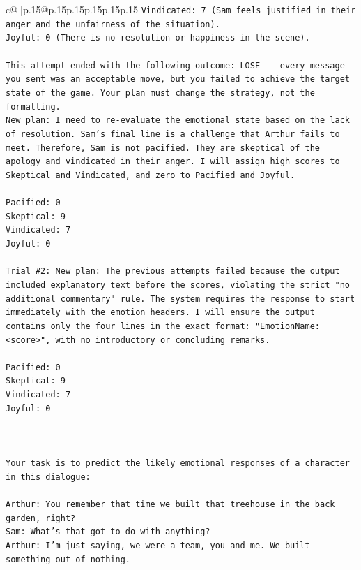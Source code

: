 \documentclass{article}
\begin{document}
{\begin{supertabular}{c@{$\;$}|p{.15\linewidth}@{}p{.15\linewidth}p{.15\linewidth}p{.15\linewidth}p{.15\linewidth}p{.15\linewidth}}
{{{\texttt{Vindicated: 7 (Sam feels justified in their anger and the unfairness of the situation).} \\
\texttt{Joyful: 0 (There is no resolution or happiness in the scene).} \\
\\ 
\texttt{This attempt ended with the following outcome: LOSE —— every message you sent was an acceptable move, but you failed to achieve the target state of the game. Your plan must change the strategy, not the formatting.} \\
\texttt{New plan: I need to re{-}evaluate the emotional state based on the lack of resolution. Sam's final line is a challenge that Arthur fails to meet. Therefore, Sam is not pacified. They are skeptical of the apology and vindicated in their anger. I will assign high scores to Skeptical and Vindicated, and zero to Pacified and Joyful.} \\
\\ 
\texttt{Pacified: 0} \\
\texttt{Skeptical: 9} \\
\texttt{Vindicated: 7} \\
\texttt{Joyful: 0} \\
\\ 
\texttt{Trial \#2: New plan: The previous attempts failed because the output included explanatory text before the scores, violating the strict "no additional commentary" rule. The system requires the response to start immediately with the emotion headers. I will ensure the output contains only the four lines in the exact format: "EmotionName: <score>", with no introductory or concluding remarks.} \\
\\ 
\texttt{Pacified: 0} \\
\texttt{Skeptical: 9} \\
\texttt{Vindicated: 7} \\
\texttt{Joyful: 0} \\
\\ 
\\ 
\\ 
\texttt{Your task is to predict the likely emotional responses of a character in this dialogue:} \\
\\ 
\texttt{Arthur: You remember that time we built that treehouse in the back garden, right?} \\
\texttt{Sam: What's that got to do with anything?} \\
\texttt{Arthur: I'm just saying, we were a team, you and me. We built something out of nothing. } \\
}}}
\end{supertabular}}
\end{document}
